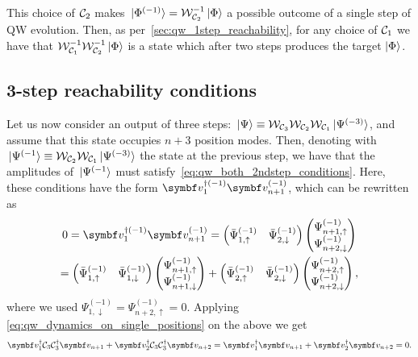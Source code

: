 This choice of ${\mathcal{C}}_2$ makes $\ket*{\Phi^{(-1)}}={\mathcal{W}}_{{\mathcal{C}}_2}^{-1}\ket\Phi$ a possible outcome of a single step of \ac{QW} evolution.
Then, as per~\cref{sec:qw_1step_reachability}, for any choice of ${\mathcal{C}}_1$ we have that
${\mathcal{W}}_{{\mathcal{C}}_1}^{-1}{\mathcal{W}}_{{\mathcal{C}}_2}^{-1}\ket\Phi$
is a state which after two steps produces the target $\ket\Phi$.


\subsection{3-step reachability conditions}
\label{sec:qw_3step_reachability}
Let us now consider an output of three steps:
$\ket*{\Psi} \equiv {\mathcal{W}}_{{\mathcal{C}}_3}{\mathcal{W}}_{{\mathcal{C}}_2}{\mathcal{W}}_{{\mathcal{C}}_1} \ket*{\Psi^{(-3)}}$,
and assume that this state occupies $n+3$ position modes.
Then, denoting with
$\ket*{\Psi^{(-1}} \equiv {\mathcal{W}}_{{\mathcal{C}}_2}{\mathcal{W}}_{{\mathcal{C}}_1} \ket*{\Psi^{(-3)}}$
the state at the previous step, we have that the amplitudes of $\ket*{\Psi^{(-1}}$ must satisfy~\cref{eq:qw_both_2ndstep_conditions}.
Here, these conditions have the form
$\bs v_1^{\dagger(-1)} \bs v_{n+1}^{(-1)}$,
which can be rewritten as
\begin{equation}
\begin{gathered}
	0 = \bs v_1^{\dagger(-1)} \bs v_{n+1}^{(-1)} = 
	\begin{pmatrix} \bar\Psi^{(-1)}_{1,\uparrow} & \bar\Psi^{(-1)}_{2,\downarrow} \end{pmatrix}
	\begin{pmatrix} \Psi^{(-1)}_{n+1,\uparrow} \\ \Psi^{(-1)}_{n+2,\downarrow} \end{pmatrix}
	\\
	=
	\begin{pmatrix} \bar\Psi^{(-1)}_{1,\uparrow} & \bar\Psi^{(-1)}_{1,\downarrow} \end{pmatrix}
	\begin{pmatrix} \Psi^{(-1)}_{n+1,\uparrow} \\ \Psi^{(-1)}_{n+1,\downarrow} \end{pmatrix} +
	\begin{pmatrix} \bar\Psi^{(-1)}_{2,\uparrow} & \bar\Psi^{(-1)}_{2,\downarrow} \end{pmatrix}
	\begin{pmatrix} \Psi^{(-1)}_{n+2,\uparrow} \\ \Psi^{(-1)}_{n+2,\downarrow} \end{pmatrix},
\end{gathered}
\end{equation}
where we used
$\Psi^{(-1)}_{1,\downarrow} = \Psi^{(-1)}_{n+2,\uparrow} = 0$.
Applying \cref{eq:qw_dynamics_on_single_positions} on the above we get
\begin{equation}
\begin{aligned}
    \bs v_1^{\dagger} \calC_3 \calC_3^\dagger \bs v_{n+1}+
    \bs v_2^{\dagger} \calC_3 \calC_3^\dagger \bs v_{n+2}  =
    \bs v_1^{\dagger} \bs v_{n+1} +
    \bs v_2^{\dagger} \bs v_{n+2} = 0.
\end{aligned}
\label{eq:qw_last_condition_for_psi3}
\end{equation}

